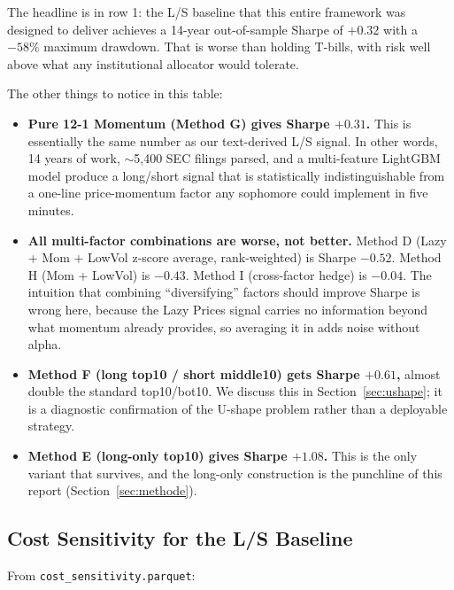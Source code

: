 \documentclass[11pt,a4paper]{article}
\begin{document}
The headline is in row 1: the L/S baseline that this entire framework was designed to deliver achieves a 14-year out-of-sample Sharpe of $+0.32$ with a $-58\%$ maximum drawdown. That is worse than holding T-bills, with risk well above what any institutional allocator would tolerate.

The other things to notice in this table:

\begin{itemize}
    \item \textbf{Pure 12-1 Momentum (Method G) gives Sharpe $+0.31$.} This is essentially the same number as our text-derived L/S signal. In other words, 14 years of work, $\sim$5,400 SEC filings parsed, and a multi-feature LightGBM model produce a long/short signal that is statistically indistinguishable from a one-line price-momentum factor any sophomore could implement in five minutes.
    \item \textbf{All multi-factor combinations are worse, not better.} Method D (Lazy + Mom + LowVol z-score average, rank-weighted) is Sharpe $-0.52$. Method H (Mom + LowVol) is $-0.43$. Method I (cross-factor hedge) is $-0.04$. The intuition that combining ``diversifying'' factors should improve Sharpe is wrong here, because the Lazy Prices signal carries no information beyond what momentum already provides, so averaging it in adds noise without alpha.
    \item \textbf{Method F (long top10 / short middle10) gets Sharpe $+0.61$,} almost double the standard top10/bot10. We discuss this in Section~\ref{sec:ushape}; it is a diagnostic confirmation of the U-shape problem rather than a deployable strategy.
    \item \textbf{Method E (long-only top10) gives Sharpe $+1.08$.} This is the only variant that survives, and the long-only construction is the punchline of this report (Section~\ref{sec:methode}).
\end{itemize}

\subsection{Cost Sensitivity for the L/S Baseline}

From \texttt{cost\_sensitivity.parquet}:
\end{document}
